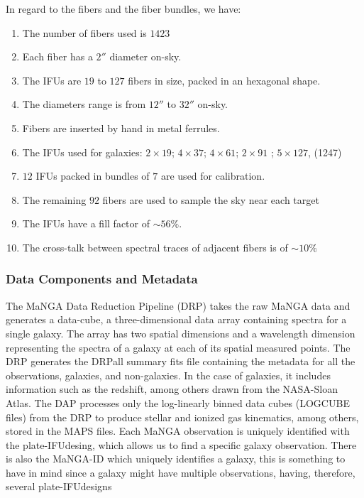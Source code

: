 In regard to the fibers and the fiber bundles, we have:

\begin{enumerate}
  \item The number of fibers used is $1423$
  
  \item Each fiber has a $2''$ diameter on-sky.
  
  \item The IFUs are $19$ to $127$ fibers in size, packed in an hexagonal shape. 
  
  \item The diameters range is from $12''$ to $32''$ on-sky. 
  
  \item Fibers are inserted by hand in metal ferrules. 
  
  \item The IFUs used for galaxies: $2 \times 19$; $4 \times 37$; $4 \times 61$; $2 \times 91$ ; $5 \times 127$, (1247)
  
  \item $12$ IFUs packed in bundles of $7$ are used for calibration. 
  
  \item The remaining $92$ fibers are used to sample the sky near each target
  
  \item The IFUs have a fill factor of $ \sim 56 \%$. 
  
  \item The cross-talk between spectral traces of adjacent fibers is of $ \sim 10 \%$
\end{enumerate}

\subsubsection*{Data Components and Metadata}

The MaNGA Data Reduction Pipeline (DRP) \citep{law2016} takes the raw MaNGA data and generates a data-cube, a three-dimensional data array containing spectra for a single galaxy. The array has two spatial dimensions and a wavelength dimension representing the spectra of a galaxy at each of its spatial measured points. The DRP generates the DRPall summary fits file containing the metadata for all the observations, galaxies, and non-galaxies. In the case of galaxies, it includes information such as the redshift, among others drawn from the NASA-Sloan Atlas. The DAP processes only the log-linearly binned data cubes (LOGCUBE files) from the DRP to produce stellar and ionized gas kinematics, among others, stored in the MAPS files. Each MaNGA observation is uniquely identified with the plate-IFUdesing, which allows us to find a specific galaxy observation. There is also the MaNGA-ID which uniquely identifies a galaxy, this is something to have in mind since a galaxy might have multiple observations, having, therefore, several plate-IFUdesigns

